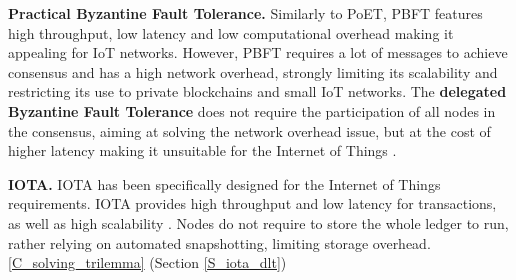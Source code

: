 \textbf{Practical Byzantine Fault Tolerance.} Similarly to PoET, PBFT features high throughput, low latency and low computational overhead making it appealing for IoT networks. However, PBFT requires a lot of messages to achieve consensus and has a high network overhead, strongly limiting its scalability and restricting its use to private blockchains and small IoT networks. The \textbf{delegated Byzantine Fault Tolerance} does not require the participation of all nodes in the consensus, aiming at solving the network overhead issue, but at the cost of higher latency making it unsuitable for the Internet of Things \cite{Salimitari2020}.

\textbf{IOTA.} IOTA has been specifically designed for the Internet of Things requirements. IOTA provides high throughput and low latency for transactions, as well as high scalability \cite{Alshaikhli2022}. Nodes do not require to store the whole ledger to run, rather relying on automated snapshotting, limiting storage overhead.  \ref{C_solving_trilemma} (Section \ref{S_iota_dlt})
